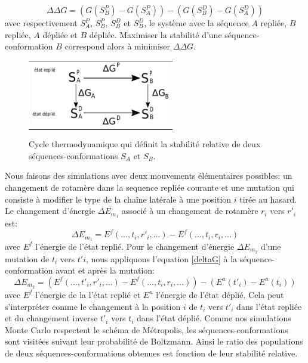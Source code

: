 \begin{equation}
  \label{deltaG}
\Delta \Delta G = (G(S^P_B)- G(S^P_A)) - (G(S^D_B)- G(S^D_A))
\end{equation}  
avec respectivement $S^P_A$, $S^P_B$, $S^D_B$ et $S^D_B$, le système avec la séquence $A$ repliée, $B$ repliée, $A$ dépliée et $B$ dépliée. Maximiser la stabilité d'une séquence-conformation $B$ correspond alors à minimiser $\Delta \Delta G$.

   \begin{figure}[!htbp]
     \centering
     \begin{tabular}{c}
       \includegraphics[width=6cm]{figure/cycleThermo.pdf} \\
     \end{tabular}
     
     \caption{Cycle thermodynamique qui définit la stabilité relative de deux séquences-conformations $S_A$ et $S_B$.}
\label{fig:cycleThermo}
   \end{figure}


Nous faisons des simulations avec deux mouvements élémentaires possibles: un changement de rotamère dans la sequence repliée courante et une mutation qui consiste à modifier le type de la chaîne latérale à une position $i$ tirée au hasard. Le changement d'énergie $\Delta E_{m_1}$ associé à un changement de rotamère $r_i$ vers $r'_i$ est:
\begin{equation}
\Delta E_{m_1}= E^f(...,t_i,r'_i,...) - E^f(...,t_i,r_i,...)     
\end{equation}   
avec $E^f$ l'énergie de l'état replié. Pour le changement d'énergie $\Delta E_{m_2}$ d'une mutation de $t_i$ vers $t'i$, nous appliquons l'equation \ref{deltaG} à la séquence-conformation avant et après la mutation:    
\begin{equation}
\Delta E_{m_2}= (E^f(...,t'_i,r'_i,...) - E^f(...,t_i,r_i,...)) - (E^u(t'_i) - E^u(t_i))     
\end{equation}   
avec $E^f$ l'énergie de la l'état replié et $E^u$ l'énergie de l'état déplié. Cela peut s'interpréter comme le changement à la position $i$ de $t_i$ vers $t'_i$ dans l'état repliée et du changement inverse $t'_i$ vers $t_i$ dans l'état déplié. Comme nos simulations Monte Carlo respectent le schéma de Métropolis, les séquences-conformations sont visitées suivant leur probabilité de Boltzmann. Ainsi le ratio des populations de deux séquences-conformations obtenues est fonction de leur stabilité relative. 
   

